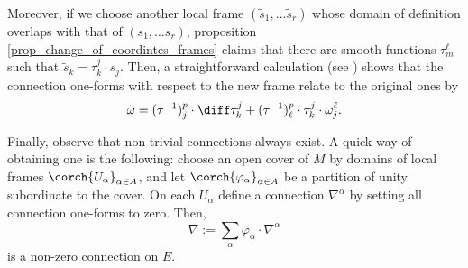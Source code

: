 \begin{obs}
    Moreover, if we choose another local frame \((\tilde{s}_1, \ldots \tilde{s}_r)\) whose domain of definition overlaps with that of \((s_1, \ldots s_r)\), proposition \ref{prop_change_of_coordintes_frames} claims that there are smooth functions \(\tau^\ell_m\) such that \(\tilde{s}_k=\tau^j_k \cdot s_j\). Then, a straightforward calculation (see \parencite[Page 195]{lee_introCM}) shows that the connection one-forms with respect to the new frame relate to the original ones by
    \begin{eqnarray}\label{eq_transf_connection_one_form}
        \tilde{\omega}=(\tau^{-1})^p_j\cdot \diff \tau^j_k + (\tau^{-1})^p_\ell \cdot \tau^j_k \cdot \omega^\ell_j.
    \end{eqnarray}
\end{obs}

Finally, observe that non-trivial connections always exist. A quick way of obtaining one is the following: choose an open cover of \(M\) by domains of local frames \(\corch{U_\alpha}_{\alpha \in A}\), and let \(\corch{\varphi_\alpha}_{\alpha \in A}\) be a partition of unity subordinate to the cover. On each \(U_\alpha\) define a connection \(\nabla^\alpha\) by setting all connection one-forms to zero. Then, 
\begin{equation} \label{def_nontrivial_connection}
\nabla:=\sum_\alpha \varphi_\alpha \cdot \nabla^\alpha
\end{equation}
is a non-zero connection on \(E\).

